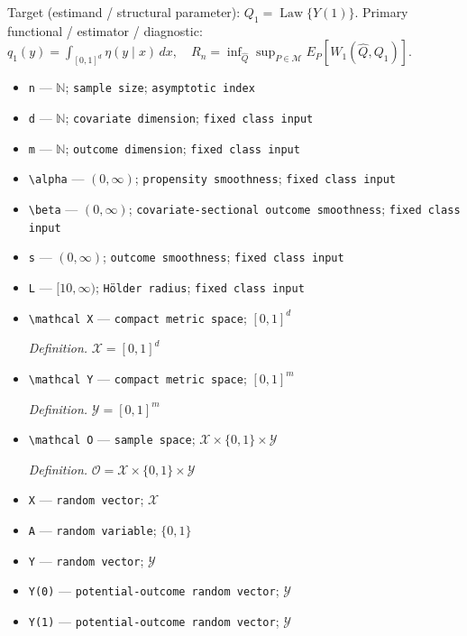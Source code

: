 \documentclass{article}
\begin{document}
Target (estimand / structural parameter): \(Q_1=\operatorname{Law}\{Y(1)\}\).
Primary functional / estimator / diagnostic: \(q_1(y)=\int_{[0,1]^d}\eta(y\mid x)\,dx,\quad R_n=\inf_{\widehat Q}\sup_{P\in\mathcal M}E_P[W_1(\widehat Q,Q_1)]\).
\begin{itemize}
  \item \texttt{n} --- \(\mathbb N\); \texttt{sample size}; \texttt{asymptotic index}
  \item \texttt{d} --- \(\mathbb N\); \texttt{covariate dimension}; \texttt{fixed class input}
  \item \texttt{m} --- \(\mathbb N\); \texttt{outcome dimension}; \texttt{fixed class input}
  \item \texttt{\textbackslash{}\allowbreak{}alpha} --- \((0,\infty)\); \texttt{propensity smoothness}; \texttt{fixed class input}
  \item \texttt{\textbackslash{}\allowbreak{}beta} --- \((0,\infty)\); \texttt{covariate-\allowbreak{}sectional outcome smoothness}; \texttt{fixed class input}
  \item \texttt{s} --- \((0,\infty)\); \texttt{outcome smoothness}; \texttt{fixed class input}
  \item \texttt{L} --- \([10,\infty)\); \texttt{Hölder radius}; \texttt{fixed class input}
  \item \texttt{\textbackslash{}\allowbreak{}mathcal X} --- \texttt{compact metric space}; \([0,1]^d\)
  \par\smallskip\noindent\emph{Definition.} \(\mathcal X=[0,1]^d\)
  \item \texttt{\textbackslash{}\allowbreak{}mathcal Y} --- \texttt{compact metric space}; \([0,1]^m\)
  \par\smallskip\noindent\emph{Definition.} \(\mathcal Y=[0,1]^m\)
  \item \texttt{\textbackslash{}\allowbreak{}mathcal O} --- \texttt{sample space}; \(\mathcal X\times\{0,1\}\times\mathcal Y\)
  \par\smallskip\noindent\emph{Definition.} \(\mathcal O=\mathcal X\times\{0,1\}\times\mathcal Y\)
  \item \texttt{X} --- \texttt{random vector}; \(\mathcal X\)
  \item \texttt{A} --- \texttt{random variable}; \(\{0,1\}\)
  \item \texttt{Y} --- \texttt{random vector}; \(\mathcal Y\)
  \item \texttt{Y(0)} --- \texttt{potential-\allowbreak{}outcome random vector}; \(\mathcal Y\)
  \item \texttt{Y(1)} --- \texttt{potential-\allowbreak{}outcome random vector}; \(\mathcal Y\)

\end{itemize}
\end{document}
